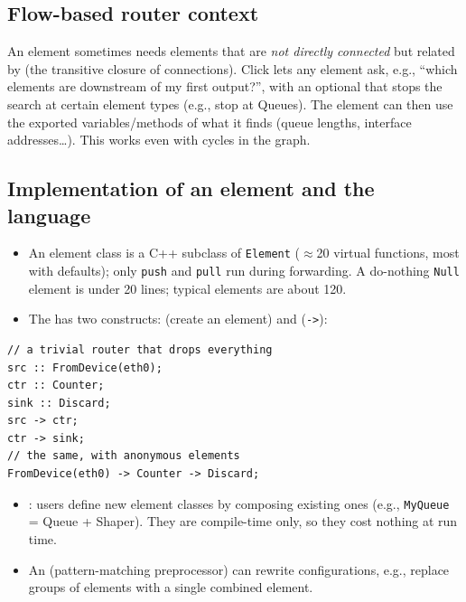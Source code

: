 \subsection{Flow-based router context}
An element sometimes needs elements that are \emph{not directly connected} but related by  (the transitive closure of connections). Click lets any element ask, e.g., ``which elements are downstream of my first output?'', with an optional  that stops the search at certain element types (e.g., stop at Queues). The element can then use the exported variables/methods of what it finds (queue lengths, interface addresses\ldots). This works even with cycles in the graph.

\subsection{Implementation of an element and the language}
\begin{itemize}
\item An element class is a C++ subclass of \texttt{Element} ($\approx$20 virtual functions, most with defaults); only \texttt{push} and \texttt{pull} run during forwarding. A do-nothing \texttt{Null} element is under 20 lines; typical elements are about 120.
\item The  has two constructs:  (create an element) and  (\texttt{->}):
\end{itemize}
\begin{lstlisting}
// a trivial router that drops everything
src :: FromDevice(eth0);
ctr :: Counter;
sink :: Discard;
src -> ctr;
ctr -> sink;
// the same, with anonymous elements
FromDevice(eth0) -> Counter -> Discard;
\end{lstlisting}
\begin{itemize}
\item {}: users define new element classes by composing existing ones (e.g., \texttt{MyQueue} = Queue + Shaper). They are compile-time only, so they cost nothing at run time.
\item An  (pattern-matching preprocessor) can rewrite configurations, e.g., replace groups of elements with a single combined element.
\end{itemize}

